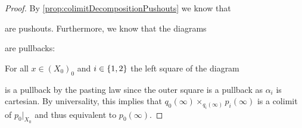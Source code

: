 \begin{lemma}
\begin{proof}
        By \cref{prop:colimitDecompositionPushouts} we know that
        \begin{center}
        \end{center}
        are pushouts.
        Furthermore, we know that the diagrams 
        \begin{center}
        \end{center}
        are pullbacks: 

        For all $x\in \left(X_0\right)_0$ and $i\in\left\lbrace1,2\right\rbrace$ the left square of the diagram 
        \begin{center}
        \end{center}
        is a pullback by the pasting law since the outer square is a pullback as $\alpha_i$ is cartesian.
        By universality, this implies that $q_0(\infty)\times_{q_i(\infty)}p_i(\infty)$ is a colimit of $p_0|_{X_0}$ and thus equivalent to $p_0(\infty)$.


\end{proof}
\end{lemma}
